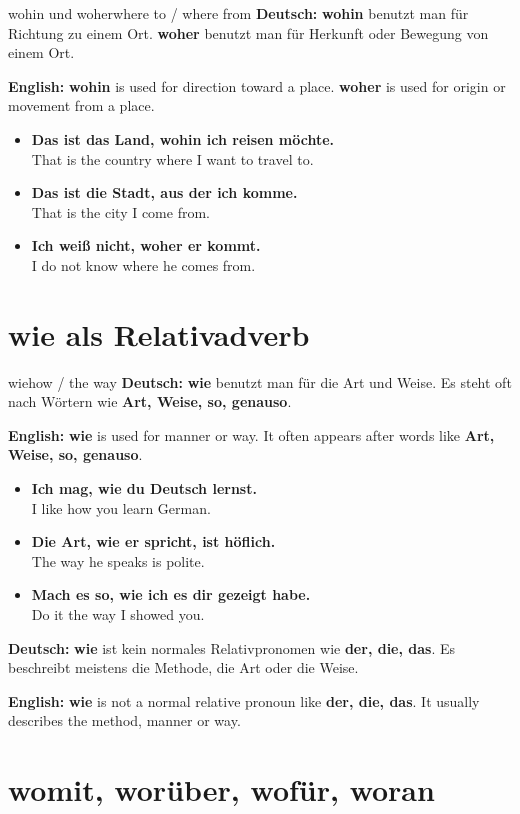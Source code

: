 \documentclass[a4paper,11pt]{article}
\newcommand{\GermanText}[1]{\textbf{Deutsch: }#1\par}
\newcommand{\EnglishText}[1]{{\small\color{SoftGray}\textbf{English: }#1\par}}
\newcommand{\ExampleItem}[2]{\item \textbf{#1}\\{\small\color{SoftGray}#2}}
\begin{document}
\begin{grammarentry}{wohin und woher}{where to / where from}
\GermanText{\textbf{wohin} benutzt man für Richtung zu einem Ort. \textbf{woher} benutzt man für Herkunft oder Bewegung von einem Ort.}
\EnglishText{\textbf{wohin} is used for direction toward a place. \textbf{woher} is used for origin or movement from a place.}

\begin{exbox}
\begin{itemize}
    \ExampleItem{Das ist das Land, wohin ich reisen möchte.}{That is the country where I want to travel to.}
    \ExampleItem{Das ist die Stadt, aus der ich komme.}{That is the city I come from.}
    \ExampleItem{Ich weiß nicht, woher er kommt.}{I do not know where he comes from.}
\end{itemize}
\end{exbox}
\end{grammarentry}

\section{wie als Relativadverb}

\begin{grammarentry}{wie}{how / the way}
\GermanText{\textbf{wie} benutzt man für die Art und Weise. Es steht oft nach Wörtern wie \textbf{Art, Weise, so, genauso}.}
\EnglishText{\textbf{wie} is used for manner or way. It often appears after words like \textbf{Art, Weise, so, genauso}.}

\begin{exbox}
\begin{itemize}
    \ExampleItem{Ich mag, wie du Deutsch lernst.}{I like how you learn German.}
    \ExampleItem{Die Art, wie er spricht, ist höflich.}{The way he speaks is polite.}
    \ExampleItem{Mach es so, wie ich es dir gezeigt habe.}{Do it the way I showed you.}
\end{itemize}
\end{exbox}

\GermanText{\textbf{wie} ist kein normales Relativpronomen wie \textbf{der, die, das}. Es beschreibt meistens die Methode, die Art oder die Weise.}
\EnglishText{\textbf{wie} is not a normal relative pronoun like \textbf{der, die, das}. It usually describes the method, manner or way.}
\end{grammarentry}

\section{womit, worüber, wofür, woran}
\end{document}
